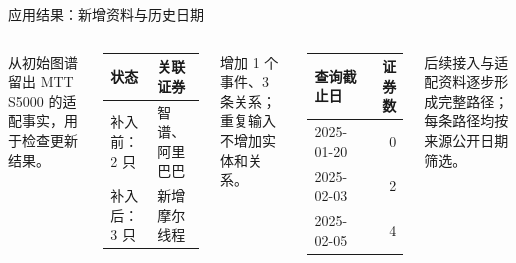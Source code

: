\begin{frame}{应用结果：新增资料与历史日期}\relax
{}
\begin{columns}[T,onlytextwidth]
从初始图谱留出 MTT S5000 的适配事实，用于检查更新结果。
\Gap
{\fontsize{11.4}{14.5}\selectfont
\begin{tabularx}{\linewidth}{@{}l X@{}}
\toprule
状态 & 关联证券\\
\midrule
补入前：2 只 & 智谱、阿里巴巴\\
补入后：3 只 & 新增摩尔线程\\
\bottomrule
\end{tabularx}}
\Gap
增加 1 个事件、3 条关系；重复输入不增加实体和关系。
{\fontsize{11.4}{14.5}\selectfont
\begin{tabularx}{\linewidth}{@{}X r@{}}
\toprule
查询截止日 & 证券数\\
\midrule
2025-01-20 & 0\\
2025-02-03 & 2\\
2025-02-05 & 4\\
\bottomrule
\end{tabularx}}
\Gap
后续接入与适配资料逐步形成完整路径；每条路径均按来源公开日期筛选。
\end{columns}
\end{frame}
